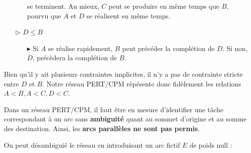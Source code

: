 \documentclass{report}
\begin{document}
\begin{multicols*}{2}
\begin{itemize}
\begin{itemize}
                se terminent. Au mieux, $C$ peut se produire en même temps que 
                $B$, pourvu que $A$ et $D$ se réalisent en même temps.
        \end{itemize}
    \item [$\rhd$ ] $D \leq B$
        \begin{itemize}
            \item [$\blacktriangleright$ ] Si $A$ se réalise rapidement, $B$ 
                peut précéder la complétion de $D$. Si non, $D$, précèdera  
                la complétion de $B$. 
        \end{itemize}
\end{itemize}

Bien qu'il y ait plusieurs contraintes implicites, il n'y a pas de contrainte 
stricte entre $D$ et $B$. Notre réseau PERT/CPM répésente donc fidèlement les relations 
$A < B, A < C, D < C$. 

\begin{note}{}{}
    Dans un réseau PERT/CPM, il faut être en mesure d'identifier une tâche 
    correspondant à un arc
    sans \textbf{ambiguité} quant au sommet d'origine et au somme des destination.
    Ainsi, les \textbf{arcs parallèles ne sont pas permis}.  
\end{note}



\begin{center}
\end{center}        

On peut désambiguié le réseau en introduisant un arc fictif $E$ de poids 
null :

\begin{center}

\end{center}
\end{multicols*}
\end{document}
